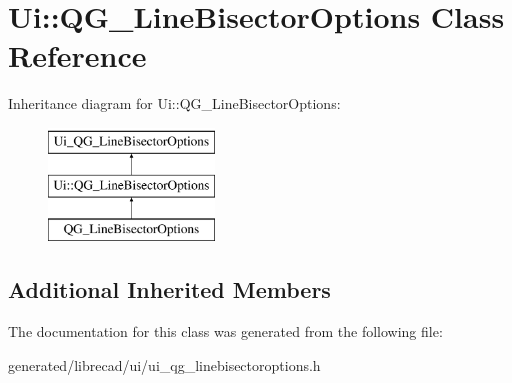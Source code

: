 \hypertarget{classUi_1_1QG__LineBisectorOptions}{\section{Ui\-:\-:Q\-G\-\_\-\-Line\-Bisector\-Options Class Reference}
\label{classUi_1_1QG__LineBisectorOptions}
}
Inheritance diagram for Ui\-:\-:Q\-G\-\_\-\-Line\-Bisector\-Options\-:\begin{figure}[H]
\begin{center}
\leavevmode
\includegraphics[height=3.000000cm]{classUi_1_1QG__LineBisectorOptions}
\end{center}
\end{figure}
\subsection*{Additional Inherited Members}


The documentation for this class was generated from the following file\-:\begin{DoxyCompactItemize}
\item 
generated/librecad/ui/ui\-\_\-qg\-\_\-linebisectoroptions.\-h\end{DoxyCompactItemize}
